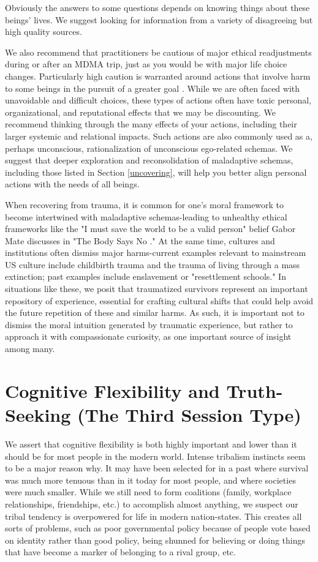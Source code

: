 \documentclass[12pt,letterpaper]{book}
\begin{document}
Obviously the answers to some questions depends on knowing things about these beings' lives. We suggest looking for information from a variety of disagreeing but high quality sources.

We also recommend that practitioners be cautious of major ethical readjustments during or after an MDMA trip, just as you would be with major life choice changes. Particularly high caution is warranted around actions that involve harm to some beings in the pursuit of a greater goal \cite{askellSelfServing}. While we are often faced with unavoidable and difficult choices, these types of actions often have toxic personal, organizational, and reputational effects that we may be discounting. We recommend thinking through the many effects of your actions, including their larger systemic and relational impacts. Such actions are also commonly used as a, perhaps unconscious, rationalization of unconscious ego-related schemas. We suggest that deeper exploration and reconsolidation of maladaptive schemas, including those listed in Section \ref{uncovering}, will help you better align personal actions with the needs of all beings.

When recovering from trauma, it is common for one's moral framework to become intertwined with maladaptive schemas-leading to unhealthy ethical frameworks like the "I must save the world to be a valid person" belief Gabor Mate discusses in "The Body Says No \cite{mate2011body}." At the same time, cultures and institutions often dismiss major harms-current examples relevant to mainstream US culture include childbirth trauma and the trauma of living through a mass extinction; past examples include enslavement or "resettlement schools." In situations like these, we posit that traumatized survivors represent an important repository of experience, essential for crafting cultural shifts that could help avoid the future repetition of these and similar harms. As such, it is important not to dismiss the moral intuition generated by traumatic experience, but rather to approach it with compassionate curiosity, as one important source of insight among many.
\section{Cognitive Flexibility and Truth-Seeking (The Third Session Type)}
\label{cognitiveflexibility}
We assert that cognitive flexibility is both highly important and lower than it should be for most people in the modern world. Intense tribalism instincts seem to be a major reason why. It may have been selected for in a past where survival was much more tenuous than in it today for most people, and where societies were much smaller. While we still need to form coalitions (family, workplace relationships, friendships, etc.) to accomplish almost anything, we suspect our tribal tendency is overpowered for life in modern nation-states. This creates all sorts of problems, such as poor governmental policy because of people vote based on identity \cite{klein2020Polarized} rather than good policy, being shunned for believing or doing things that have become a marker of belonging to a rival group, etc.
\end{document}
